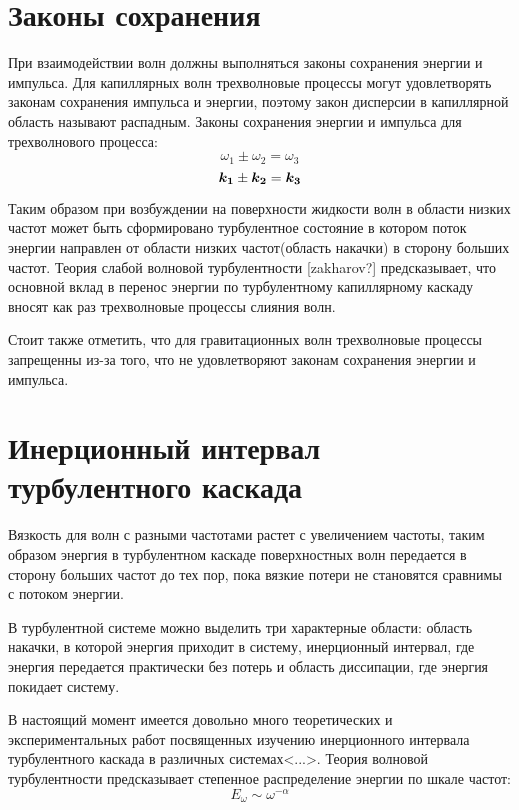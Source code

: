 \section{Законы сохранения} %

При взаимодействии волн должны выполняться законы сохранения энергии и импульса. Для капиллярных волн трехволновые процессы могут удовлетворять законам сохранения импульса и энергии, поэтому закон дисперсии в капиллярной область называют распадным. Законы сохранения энергии и импульса для трехволнового процесса:
\begin{equation}
 \label{eq:saveOmega}
\omega_1 \pm \omega_2 = \omega_3
\end{equation}
\begin{equation}
 \label{eq:saveK}
\mbox{\boldmath$k_1$} \pm \mbox{\boldmath$k_2$} = \mbox{\boldmath$k_3$}
\end{equation}

Таким образом при возбуждении на поверхности жидкости волн в области низких частот может быть сформировано турбулентное состояние в котором поток энергии направлен от области низких частот(область накачки) в сторону больших частот. Теория слабой волновой турбулентности [zakharov?] предсказывает, что основной вклад в перенос энергии по турбулентному капиллярному каскаду вносят как раз трехволновые процессы слияния волн. 

Стоит также отметить, что для гравитационных волн трехволновые процессы запрещенны из-за того, что не удовлетворяют законам сохранения энергии и импульса.

\section{Инерционный интервал турбулентного каскада}%
Вязкость для волн с разными частотами растет с увеличением частоты, таким образом энергия в турбулентном каскаде поверхностных волн передается в сторону больших частот до тех пор, пока вязкие потери не становятся сравнимы с потоком энергии.

В турбулентной системе можно выделить три характерные области: область накачки, в которой энергия приходит в систему, инерционный интервал, где энергия передается практически без потерь и область диссипации, где энергия покидает систему. 

В настоящий момент имеется довольно много теоретических и экспериментальных работ посвященных изучению инерционного интервала турбулентного каскада в различных системах<...>. Теория волновой турбулентности предсказывает степенное распределение энергии по шкале частот:
\begin{equation}
\label{eq:EOmega}
E_\omega \sim \omega^{-\alpha}
\end{equation}

